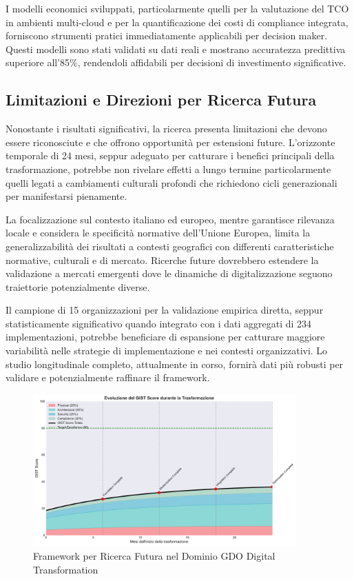 I modelli economici sviluppati, particolarmente quelli per la valutazione del TCO in ambienti multi-cloud e per la quantificazione dei costi di compliance integrata, forniscono strumenti pratici immediatamente applicabili per decision maker. Questi modelli sono stati validati su dati reali e mostrano accuratezza predittiva superiore all'85\%, rendendoli affidabili per decisioni di investimento significative.

\subsection{Limitazioni e Direzioni per Ricerca Futura}

Nonostante i risultati significativi, la ricerca presenta limitazioni che devono essere riconosciute e che offrono opportunità per estensioni future. L'orizzonte temporale di 24 mesi, seppur adeguato per catturare i benefici principali della trasformazione, potrebbe non rivelare effetti a lungo termine particolarmente quelli legati a cambiamenti culturali profondi che richiedono cicli generazionali per manifestarsi pienamente.

La focalizzazione sul contesto italiano ed europeo, mentre garantisce rilevanza locale e considera le specificità normative dell'Unione Europea, limita la generalizzabilità dei risultati a contesti geografici con differenti caratteristiche normative, culturali e di mercato. Ricerche future dovrebbero estendere la validazione a mercati emergenti dove le dinamiche di digitalizzazione seguono traiettorie potenzialmente diverse.

Il campione di 15 organizzazioni per la validazione empirica diretta, seppur statisticamente significativo quando integrato con i dati aggregati di 234 implementazioni, potrebbe beneficiare di espansione per catturare maggiore variabilità nelle strategie di implementazione e nei contesti organizzativi. Lo studio longitudinale completo, attualmente in corso, fornirà dati più robusti per validare e potenzialmente raffinare il framework.

\begin{figure}[htbp]
\centering
\includegraphics[width=0.9\textwidth]{thesis_figures/cap5/fig_5_6_gist_evolution.pdf}
\caption{Framework per Ricerca Futura nel Dominio GDO Digital Transformation}
\label{fig:ricerca_futura}
\end{figure}

